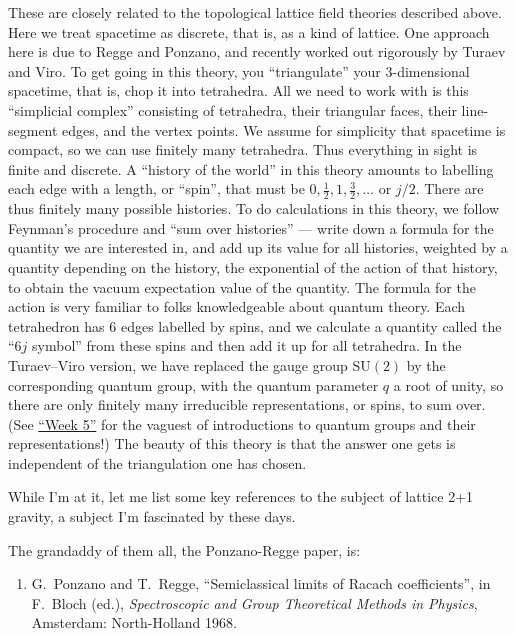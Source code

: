 \documentclass[12pt]{article}
\def\tightlist{}
\begin{document}
These are closely related to the topological lattice field theories
described above. Here we treat spacetime as discrete, that is, as a kind
of lattice. One approach here is due to Regge and Ponzano, and recently
worked out rigorously by Turaev and Viro. To get going in this theory,
you ``triangulate'' your \(3\)-dimensional spacetime, that is, chop it
into tetrahedra. All we need to work with is this ``simplicial complex''
consisting of tetrahedra, their triangular faces, their line-segment
edges, and the vertex points. We assume for simplicity that spacetime is
compact, so we can use finitely many tetrahedra. Thus everything in
sight is finite and discrete. A ``history of the world'' in this theory
amounts to labelling each edge with a length, or ``spin'', that must be
\(0,\frac{1}{2},1,\frac{3}{2},\ldots\) or \(j/2\). There are thus finitely many possible
histories. To do calculations in this theory, we follow Feynman's
procedure and ``sum over histories'' --- write down a formula for the
quantity we are interested in, and add up its value for all histories,
weighted by a quantity depending on the history, the exponential of the
action of that history, to obtain the vacuum expectation value of the
quantity. The formula for the action is very familiar to folks
knowledgeable about quantum theory. Each tetrahedron has 6 edges
labelled by spins, and we calculate a quantity called the ``\(6j\)
symbol'' from these spins and then add it up for all tetrahedra. In the
Turaev--Viro version, we have replaced the gauge group \(\mathrm{SU}(2)\)
by the corresponding quantum group, with the quantum parameter \(q\) a
root of unity, so there are only finitely many irreducible
representations, or spins, to sum over. (See
\protect\hyperlink{week5}{``Week 5''} for the vaguest of introductions
to quantum groups and their representations!) The beauty of this theory
is that the answer one gets is independent of the triangulation one has
chosen.

While I'm at it, let me list some key references to the subject of
lattice 2+1 gravity, a subject I'm fascinated by these days.

The grandaddy of them all, the Ponzano-Regge paper, is:

\begin{enumerate}
\def\labelenumi{\arabic{enumi})}
\setcounter{enumi}{5}
\tightlist
\item
  G.\ Ponzano and T.\ Regge, ``Semiclassical limits of Racach coefficients'', 
  in F.\ Bloch (ed.), \emph{Spectroscopic and
  Group Theoretical Methods in Physics}, Amsterdam: North-Holland 1968.
\end{enumerate}
\end{document}
